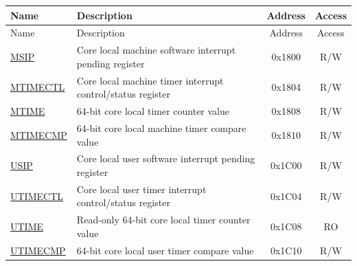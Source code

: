 
\begin{longtable}{ | p{4.0cm} | p{8.4cm} | c | c| }
\hline\rowcolor{lightgray}
Name & Description & Address & Access \\ \hline
\endfirsthead
\hline
\rowcolor{lightgray}
Name & Description & Address & Access  \\
\hline
\endhead
\endfoot

\hyperref[regdesc:CLINTMSIPREG] {MSIP} & Core local machine software interrupt pending register & 0x1800 & R/W \\\hline
\hyperref[regdesc:CLINTMTIMECTLREG] {MTIMECTL} & Core local machine timer interrupt control/status register & 0x1804 & R/W \\\hline
\hyperref[regdesc:CLINTMTIMEREG] {MTIME} & 64-bit core local timer counter value & 0x1808 & R/W \\\hline
\hyperref[regdesc:CLINTMTIMECMPREG] {MTIMECMP} & 64-bit core local machine timer compare value & 0x1810 & R/W \\\hline
\hyperref[regdesc:CLINTUSIPREG] {USIP} & Core local user software interrupt pending register & 0x1C00 & R/W \\\hline
\hyperref[regdesc:CLINTUTIMECTLREG] {UTIMECTL} & Core local user timer interrupt control/status register & 0x1C04 & R/W \\\hline
\hyperref[regdesc:CLINTUTIMEREG] {UTIME} & Read-only 64-bit core local timer counter value & 0x1C08 & RO \\\hline
\hyperref[regdesc:CLINTUTIMECMPREG] {UTIMECMP} & 64-bit core local user timer compare value & 0x1C10 & R/W \\\hline
\end{longtable}
